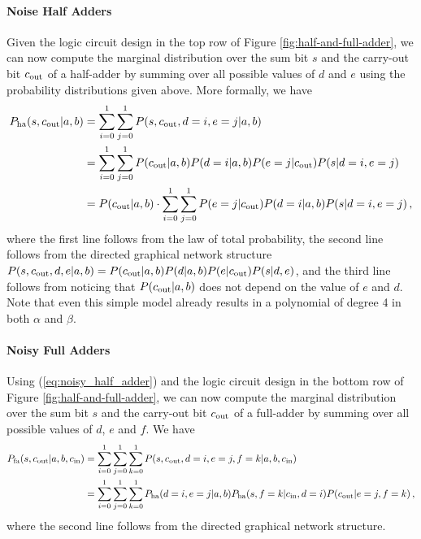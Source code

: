 \paragraph{Noise Half Adders} Given the logic circuit design in the top row of Figure \ref{fig:half-and-full-adder}, we can now compute the marginal distribution over the sum bit $s$ and the carry-out bit $c_{\mathrm{out}}$ of a half-adder by summing over all possible values of $d$ and $e$ using the probability distributions given above. More formally, we have 
\begin{align}
    P_{\mathrm{ha}}(s,c_{\mathrm{out}}|a,b) & = \sum_{i=0}^1 \sum_{j=0}^1 P(s,c_{\mathrm{out}},d=i,e=j|a,b) \\
    & = \sum_{i=0}^1 \sum_{j=0}^1 P(c_{\mathrm{out}}|a,b) P(d=i|a,b) P(e=j|c_{\mathrm{out}}) P(s|d=i,e=j) \\
    & = P(c_{\mathrm{out}}|a,b) \cdot \sum_{i=0}^1 \sum_{j=0}^1 P(e=j|c_{\mathrm{out}}) P(d=i|a,b) P(s|d=i,e=j) \label{eq:noisy_half_adder} \,,
\end{align}
where the first line follows from the law of total probability, the second line follows from the directed graphical network structure $P(s,c_{\mathrm{out}},d,e|a,b)=P(c_{\mathrm{out}}|a,b)P(d|a,b)P(e|c_{\mathrm{out}})P(s|d,e)$, and the third line follows from noticing that $P(c_{\mathrm{out}}|a,b)$ does not depend on the value of $e$ and $d$. Note that even this simple model already results in a polynomial of degree 4 in both $\alpha$ and $\beta$. 

\paragraph{Noisy Full Adders} Using (\ref{eq:noisy_half_adder}) and the logic circuit design in the bottom row of Figure \ref{fig:half-and-full-adder}, we can now compute the marginal distribution over the sum bit $s$ and the carry-out bit $c_{\mathrm{out}}$ of a full-adder by summing over all possible values of $d$, $e$ and $f$. We have 
\begin{align}
    P_{\mathrm{fa}}(s,c_{\mathrm{out}}|a,b,c_{\mathrm{in}}) & = \sum_{i=0}^1 \sum_{j=0}^1 \sum_{k=0}^1 P(s,c_{\mathrm{out}},d=i,e=j,f=k|a,b,c_{\mathrm{in}}) \\
    & = \sum_{i=0}^1 \sum_{j=0}^1 \sum_{k=0}^1 P_{\mathrm{ha}}(d=i,e=j|a,b) P_{\mathrm{ha}}(s,f=k|c_{\mathrm{in}},d=i) P(c_{\mathrm{out}}|e=j,f=k) \label{eq:noisy_full_adder} \,,
\end{align}
where the second line follows from the directed graphical network structure.

